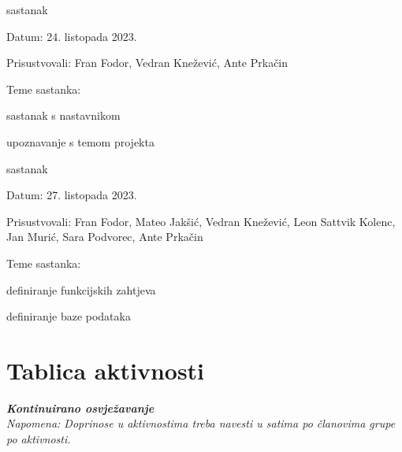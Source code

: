 \begin{packed_enum}
			\item  sastanak
			\item[] \begin{packed_item}
				\item Datum: {24. listopada 2023.}
				\item Prisustvovali: {Fran Fodor, Vedran Knežević, Ante Prkačin}
				\item Teme sastanka:
				\begin{packed_item}
					\item  sastanak s nastavnikom
					\item  upoznavanje s temom projekta
				\end{packed_item}
			\end{packed_item}

			\item  sastanak
			\item[] \begin{packed_item}
				\item Datum: {27. listopada 2023.}
				\item Prisustvovali: {Fran Fodor, Mateo Jakšić, Vedran Knežević, Leon Sattvik Kolenc, Jan Murić, Sara Podvorec, Ante Prkačin}
				\item Teme sastanka:
				\begin{packed_item}
					\item  definiranje funkcijskih zahtjeva
					\item  definiranje baze podataka
				\end{packed_item}
			\end{packed_item}
			
			
		\end{packed_enum}
		
		\eject
		\section*{Tablica aktivnosti}
		
			\textbf{\textit{Kontinuirano osvježavanje}}\\
			
			 \textit{Napomena: Doprinose u aktivnostima treba navesti u satima po članovima grupe po aktivnosti.}

